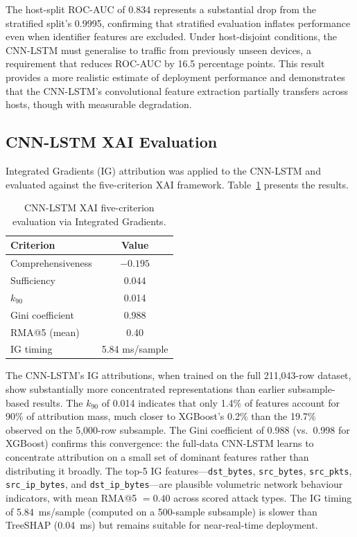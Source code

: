 \documentclass[12pt,a4paper]{report}
\begin{document}
The host-split ROC-AUC of 0.834 represents a substantial drop from the stratified split's 0.9995, confirming that stratified evaluation inflates performance even when identifier features are excluded. Under host-disjoint conditions, the CNN-LSTM must generalise to traffic from previously unseen devices, a requirement that reduces ROC-AUC by 16.5 percentage points. This result provides a more realistic estimate of deployment performance and demonstrates that the CNN-LSTM's convolutional feature extraction partially transfers across hosts, though with measurable degradation.

\subsection{CNN-LSTM XAI Evaluation}
\label{sec:cnnlstm-xai}

Integrated Gradients (IG) attribution was applied to the CNN-LSTM and evaluated against the five-criterion XAI framework. Table~\ref{tab:cnnlstm-xai} presents the results.

\begin{table}[H]
\centering
\caption{CNN-LSTM XAI five-criterion evaluation via Integrated Gradients.}
\label{tab:cnnlstm-xai}
\begin{tabular}{lc}
\toprule
\textbf{Criterion} & \textbf{Value} \\
\midrule
Comprehensiveness & $-0.195$ \\
Sufficiency & $0.044$ \\
$k_{90}$ & 0.014 \\
Gini coefficient & 0.988 \\
RMA@5 (mean) & 0.40 \\
IG timing & 5.84 ms/sample \\
\bottomrule
\end{tabular}
\end{table}

The CNN-LSTM's IG attributions, when trained on the full 211,043-row dataset, show substantially more concentrated representations than earlier subsample-based results. The $k_{90}$ of 0.014 indicates that only 1.4\% of features account for 90\% of attribution mass, much closer to XGBoost's 0.2\% than the 19.7\% observed on the 5,000-row subsample. The Gini coefficient of 0.988 (vs.\ 0.998 for XGBoost) confirms this convergence: the full-data CNN-LSTM learns to concentrate attribution on a small set of dominant features rather than distributing it broadly. The top-5 IG features---\texttt{dst\_bytes}, \texttt{src\_bytes}, \texttt{src\_pkts}, \texttt{src\_ip\_bytes}, and \texttt{dst\_ip\_bytes}---are plausible volumetric network behaviour indicators, with mean RMA@5 $= 0.40$ across scored attack types. The IG timing of 5.84~ms/sample (computed on a 500-sample subsample) is slower than TreeSHAP (0.04~ms) but remains suitable for near-real-time deployment.
\end{document}
